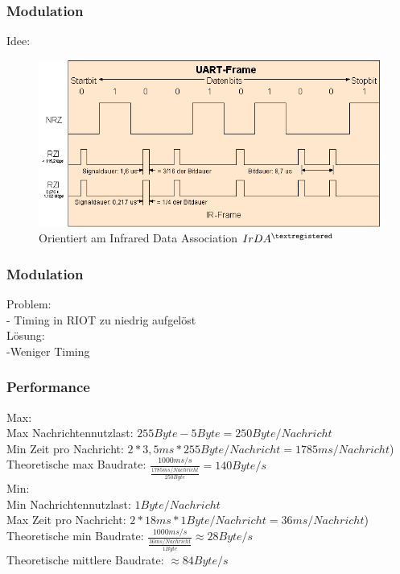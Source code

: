 \documentclass{beamer}
\begin{document}
 	\begin{frame} %
 		\frametitle{ Modulation } %
 		{\LARGE Idee:}
 		\break
 		\begin{figure}
 			\begin{center}
 				\includegraphics[scale=0.5]{Medien/Modulation.PNG}\\
 				Orientiert am Infrared Data Association $IrDA^{\textregistered}$
 			\end{center}
 		\end{figure}
 	\end{frame}
 	
 	\begin{frame} %
 		\frametitle{ Modulation } %
 		{\LARGE Problem:}\\
 		- Timing in RIOT zu niedrig aufgelöst\\
 		\break
 		{\LARGE Lösung:}\\
 		-Weniger Timing\\
 		
 	\end{frame}
 	
 	\begin{frame} %
 		\frametitle{ Performance } %
 		{\Large Max:}\\
 		Max Nachrichtennutzlast: $255 Byte - 5 Byte = 250 Byte/Nachricht$\\
 		Min Zeit pro Nachricht: $2 * 3,5 ms * 255 Byte/Nachricht = 1785 ms/Nachricht$)\\
 		Theoretische max Baudrate: $\frac{1000 ms/s}{\frac{1785 ms/Nachricht}{250 Byte}} = 140 Byte/s$\\
 		{\Large Min:}\\
 		Min Nachrichtennutzlast: $1 Byte/Nachricht$\\
 		Max Zeit pro Nachricht: $2 * 18 ms * 1 Byte/Nachricht = 36 ms/Nachricht$)\\
 		Theoretische min Baudrate: $\frac{1000 ms/s}{\frac{36 ms/Nachricht}{1 Byte}} \approx 28 Byte/s$\\
 		
 		Theoretische mittlere Baudrate: $\approx 84 Byte/s$
 		
 	\end{frame}
 	
\end{document}
